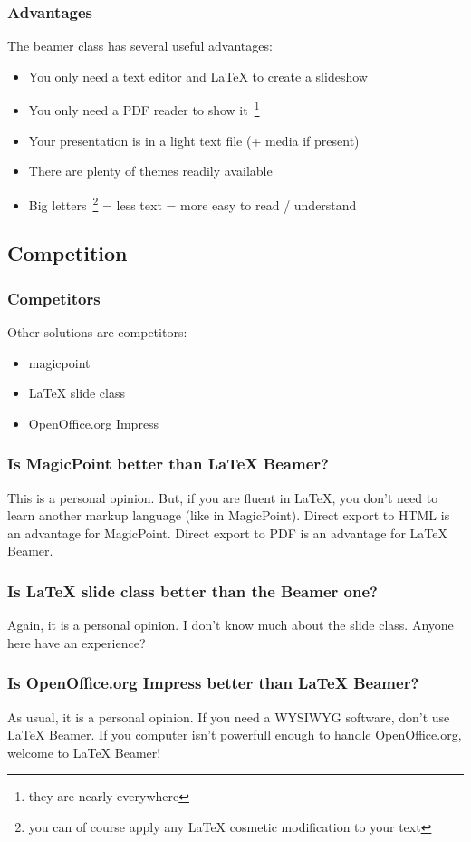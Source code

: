 \documentclass{beamer}
\begin{document}
\frame
{
	\frametitle{Advantages}

	The beamer class has several useful advantages:

	\begin{itemize}
	\item You only need a text editor and LaTeX to create a slideshow
	\item You only need a PDF reader to show it~\footnote{they are nearly everywhere}
	\item Your presentation is in a light text file (+ media if present)
	\item There are plenty of themes readily available
	\item Big letters~\footnote{you can of course apply any LaTeX cosmetic modification to your text} = less text = more easy to read / understand
	\end{itemize}
}

\subsection{Competition}

\frame
{
	\frametitle{Competitors}

	Other solutions are competitors:

	\begin{itemize}
	\item magicpoint
	\item LaTeX slide class
	\item OpenOffice.org Impress
	\end{itemize}
}

\frame
{
	\frametitle{Is MagicPoint better than LaTeX Beamer?}

	This is a personal opinion. But, if you are fluent in LaTeX, you don't need to learn another markup language (like in MagicPoint). Direct export to HTML is an advantage for MagicPoint. Direct export to PDF is an advantage for LaTeX Beamer.
}

\frame
{
	\frametitle{Is LaTeX slide class better than the Beamer one?}

	Again, it is a personal opinion. I don't know much about the slide class. Anyone here have an experience?
}

\frame
{
	\frametitle{Is OpenOffice.org Impress better than LaTeX Beamer?}

	As usual, it is a personal opinion. If you need a WYSIWYG software, don't use LaTeX Beamer. If you computer isn't powerfull enough to handle OpenOffice.org, welcome to LaTeX Beamer!
}
\end{document}

